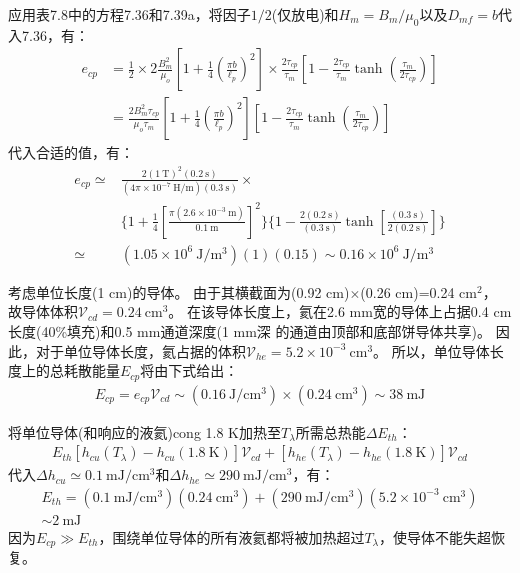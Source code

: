 应用表7.8中的方程7.36和7.39a，将因子$1/2$(仅放电)和$H_m=B_m/\mu_0$以及$D_{mf}=b$代入7.36，有：
\begin{align*}%
e_{cp}&=\frac{1}{2}\times 2\frac{B_{m}^{2}}{\mu_o}\left[1+\frac{1}{4}\left(\frac{\pi b}{\ell_{p}}\right)^2\right]\times\frac{2\tau_{cp}}{\tau_m}\left[1-\frac{2\tau_{cp}}{\tau_m}\tanh\left(\frac{\tau_m}{2\tau_{cp}}\right)\right] \\
&=\frac{2B_{m}^{2}\tau_{cp}}{\mu_o\tau_m}\left[1+\frac{1}{4}\left(\frac{\pi b}{\ell_{p}}\right)^2\right]\left[1-\frac{2\tau_{cp}}{\tau_m}\tanh\left(\frac{\tau_m}{2\tau_{cp}}\right)\right] \tag{S7.5b}
\end{align*}
代入合适的值，有：
\begin{align*}%
e_{cp}\simeq&\frac{2(1\ \mathrm{T})^2(0.2\ \mathrm{s})}{(4\pi\times 10^{-7}\ \mathrm{H/m})(0.3\ \mathrm{s})}\times \\
&\{1+\frac{1}{4}\left[\frac{\pi(2.6\times 10^{-3}\ \mathrm{m})}{0.1\ \mathrm{m}}\right]^2\}\{1-\frac{2(0.2\ \mathrm{s})}{(0.3\ \mathrm{s})}\tanh\left[\frac{(0.3\ \mathrm{s})}{2(0.2\ \mathrm{s})}\right]\}  \\
\simeq&(1.05\times 10^6\ \mathrm{J/m^3})(1)(0.15)\sim 0.16\times 10^6\ \mathrm{J/m^3}
\end{align*}

考虑单位长度(1 cm)的导体。
由于其横截面为(0.92 cm)$\times$(0.26 cm)=0.24 $\mathrm{cm^2}$，
故导体体积$\mathcal{V}_{cd}=0.24\ \mathrm{cm^3}$。
在该导体长度上，氦在2.6 mm宽的导体上占据0.4 cm长度(40\%填充)和0.5 mm通道深度(1 mm深
的通道由顶部和底部饼导体共享)。
因此，对于单位导体长度，氦占据的体积$\mathcal{V}_{he}=5.2\times 10^{-3}\ \mathrm{cm^3}$。
所以，单位导体长度上的总耗散能量$E_{cp}$将由下式给出：
\begin{align*}%
E_{cp}=e_{cp}\mathcal{V}_{cd}
\sim(0.16\ \mathrm{J/cm^3})\times(0.24\ \mathrm{cm^3})\sim 38\ \mathrm{mJ} \tag{S7.9}
\end{align*}

将单位导体(和响应的液氦)cong 1.8 K加热至$T_\lambda$所需总热能$\Delta E_{th}$：
\begin{align*}%
E_{th}[h_{cu}(T_\lambda)-h_{cu}(1.8\ \mathrm{K})]\mathcal{V}_{cd}+[h_{he}(T_\lambda)-h_{he}(1.8\ \mathrm{K})]\mathcal{V}_{cd} \tag{S7.10}
\end{align*}
代入$\Delta h_{cu}\simeq 0.1\ \mathrm{mJ/cm^3}$和$\Delta h_{he}\simeq 290\ \mathrm{mJ/cm^3}$，有：
\begin{align*}%
E_{th}=(0.1\ \mathrm{mJ/cm^3})(0.24\ \mathrm{cm^3})+(290\ \mathrm{mJ/cm^3})(5.2\times 10^{-3}\ \mathrm{cm^3}) \\\tag{S7.11}
\sim 2\ \mathrm{mJ}
\end{align*}
因为$E_{cp}\gg E_{th}$，围绕单位导体的所有液氦都将被加热超过$T_\lambda$，使导体不能失超恢复。



